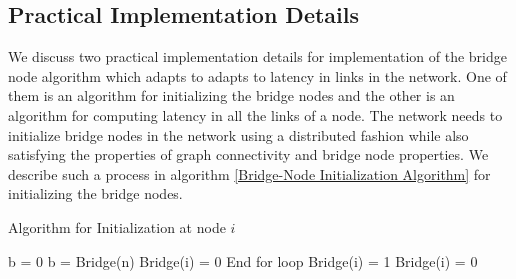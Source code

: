\documentclass[letterpaper, 10 pt, conference]{ieeeconf}  %
\begin{document}


\subsection{Practical Implementation Details}

We discuss two practical implementation details for implementation of the bridge node algorithm which adapts to adapts to latency in links in the network. One of them is an algorithm for initializing the bridge nodes and the other is an algorithm for computing latency in all the links of a node. The network needs to initialize bridge nodes in the network using a distributed fashion while also satisfying the properties of graph connectivity and bridge node properties. We describe such a process in algorithm \ref{Bridge-Node Initialization Algorithm} for initializing the bridge nodes. 

\begin{algorithm}
\caption{Algorithm for Initialization at node $i$}
\label{Bridge-Node Initialization Algorithm}
\begin{algorithmic} 
\State b = 0
\State b = Bridge(n)
\State Bridge(i) = 0
\State End for loop
\EndIf
\EndFor
{}
\State Bridge(i) = 1
\Else
\State Bridge(i) = 0
\EndIf
\end{algorithmic}
\end{algorithm}
\end{document}
